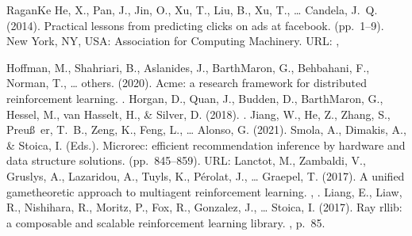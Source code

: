 \documentclass[letterpaper,10pt,english]{sphinxmanual}
\begin{document}
\begin{sphinxthebibliography}{Ragan\sphinxhyphen{}Ke}
\sphinxAtStartPar
He, X., Pan, J., Jin, O., Xu, T., Liu, B., Xu, T., … Candela, J. Q. (2014). Practical lessons from predicting clicks on ads at facebook.  (pp. 1–9). New York, NY, USA: Association for Computing Machinery. URL: , %
\begin{footnote}[81]\sphinxAtStartFootnote
{}
%
\end{footnote}
\sphinxAtStartPar
Hoffman, M., Shahriari, B., Aslanides, J., Barth\sphinxhyphen{}Maron, G., Behbahani, F., Norman, T., … others. (2020). Acme: a research framework for distributed reinforcement learning. .
\sphinxAtStartPar
Horgan, D., Quan, J., Budden, D., Barth\sphinxhyphen{}Maron, G., Hessel, M., van Hasselt, H., \& Silver, D. (2018). .
\sphinxAtStartPar
Jiang, W., He, Z., Zhang, S., Preuß er, T. B., Zeng, K., Feng, L., … Alonso, G. (2021). Smola, A., Dimakis, A., \& Stoica, I. (Eds.). Microrec: efficient recommendation inference by hardware and data structure solutions.  (pp. 845–859). URL: 
\sphinxAtStartPar
Lanctot, M., Zambaldi, V., Gruslys, A., Lazaridou, A., Tuyls, K., Pérolat, J., … Graepel, T. (2017). A unified game\sphinxhyphen{}theoretic approach to multiagent reinforcement learning. , .
\sphinxAtStartPar
Liang, E., Liaw, R., Nishihara, R., Moritz, P., Fox, R., Gonzalez, J., … Stoica, I. (2017). Ray rllib: a composable and scalable reinforcement learning library. , p. 85.

\end{sphinxthebibliography}
\end{document}
